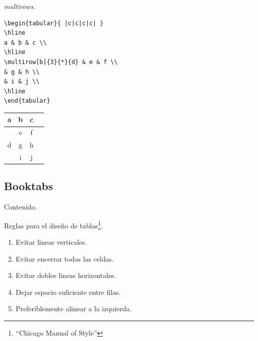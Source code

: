 \documentclass[dvipsnames,xcolor, handout]{beamer}
\theoremstyle{plain}
\theoremstyle{definition}
\begin{document}
\begin{frame}[fragile]{\itshape multirows.}
\begin{minipage}{0.6\linewidth}
\begin{verbatim}
\begin{tabular}{ |c|c|c|c| } 
\hline
a & b & c \\
\hline
\multirow[b]{3}{*}{d} & e & f \\ 
& g & h \\ 
& i & j \\ 
\hline
\end{tabular}
\end{verbatim}    
\end{minipage}
\begin{minipage}{0.3\linewidth}
\centering
\begin{tabular}{ |c|c|c|c| } 
\hline
a & b & c \\
\hline
\multirow[b]{3}{*}{d} & e & f \\ 
& g & h \\ 
& i & j \\ 
\hline
\end{tabular}
\end{minipage}
\end{frame}

\subsection{Booktabs}
\begin{frame}{Contenido.}
\begin{multicols}{2}
  \tableofcontents[currentsubsection]
\end{multicols}
\end{frame}

\begin{frame}{Reglas para el diseño de tablas\footnote{``Chicago Manual of Style''}.}

    \begin{enumerate}
        \item Evitar lineas verticales.
        \item Evitar encerrar todas las celdas.
        \item Evitar dobles lineas horizontales.
        \item Dejar espacio suficiente entre filas.
        \item Preferiblemente alinear a la izquierda.
    \end{enumerate}
\end{frame}
\end{document}
